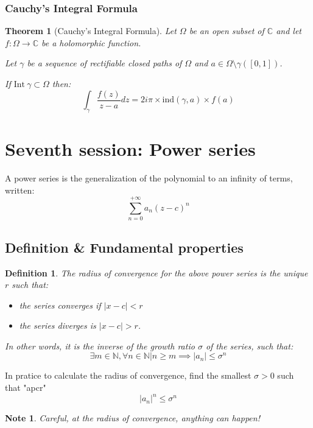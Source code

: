 \documentclass{article}
\newtheorem*{defi}{Definition}
\newtheorem*{note}{Note}
\newtheorem*{thm*}{Theorem}
\begin{document}
\subsubsection{Cauchy's Integral Formula}
\begin{thm*}[Cauchy's Integral Formula]
    Let $\Omega$ be an open subset of $\mathbb{C}$ and let $f: \Omega \rightarrow \mathbb{C}$ be a holomorphic function.

    Let $\gamma$ be a sequence of rectifiable closed paths of $\Omega$ and $a\in\Omega\setminus\gamma([0,1])$.

    If $\mathrm{Int}~\gamma\subset\Omega$ then:
    $$\int_\gamma \frac{f(z)}{z-a}dz = 2i\pi \times \mathrm{ind}(\gamma, a) \times f(a)$$
\end{thm*}

\newpage

\section{Seventh session: Power series}

A power series is the generalization of the polynomial to an infinity of terms, written:
$$\sum_{n=0}^{+\infty}a_n(z-c)^n$$

\subsection{Definition \& Fundamental properties}

\begin{defi}
    The radius of convergence for the above power series is the unique $r$ such that:
    \begin{itemize}
        \item the series converges if $|x - c| < r$ 
        \item the series diverges is $|x - c| > r$.
    \end{itemize}

    In other words, it is the inverse of the growth ratio $\sigma$ of the series, such that:
    $$\exists m \in \mathbb{N}, \forall n \in \mathbb{N} \vert n \geq m \implies |a_n| \leq \sigma^n $$
\end{defi}

In pratice to calculate the radius of convergence, find the smallest $\sigma > 0$ such that "apcr" $$|a_n|^n \leq \sigma^n$$

\begin{note}
    Careful, at the radius of convergence, anything can happen!
\end{note}
\end{document}
